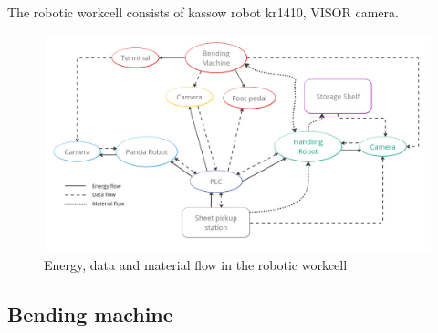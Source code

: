 The robotic workcell consists of kassow robot kr1410, VISOR camera.
\begin{figure}[h]
    \centering
    \includegraphics[width=\textwidth]{3. System Design/3.1 Overview of the Robotic Workcell/robot_workcell_overview.jpg}
    \caption{Energy, data and material flow in the robotic workcell}
    \label{fig:flow_workcell}
\end{figure}

\subsection{Bending machine}

